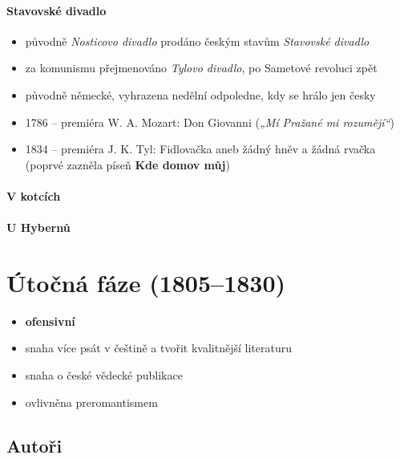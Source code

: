 \paragraph{Stavovské divadlo}
\begin{itemize}
\item původně \textit{Nosticovo divadlo} \ra prodáno českým stavům \ra \textit{Stavovské divadlo}
\item za komunismu přejmenováno \textit{Tylovo divadlo}, po Sametové revoluci zpět
\item původně německé, vyhrazena nedělní odpoledne, kdy se hrálo jen česky
\item 1786 -- premiéra W. A. Mozart: Don Giovanni (\textit{„Mí Pražané mi rozumějí“})
\item 1834 -- premiéra J. K. Tyl: Fidlovačka aneb žádný hněv a žádná rvačka (poprvé zazněla píseň \textbf{Kde domov můj})
\end{itemize}

\paragraph{V kotcích}
\paragraph{U Hybernů}



\newpage
\section{Útočná fáze (1805--1830)}
\begin{itemize}
\item \textbf{ofensivní}
\item snaha více psát v češtině a tvořit kvalitnější literaturu
\item snaha o české vědecké publikace
\item ovlivněna preromantismem
\end{itemize}

\subsection{Autoři}
